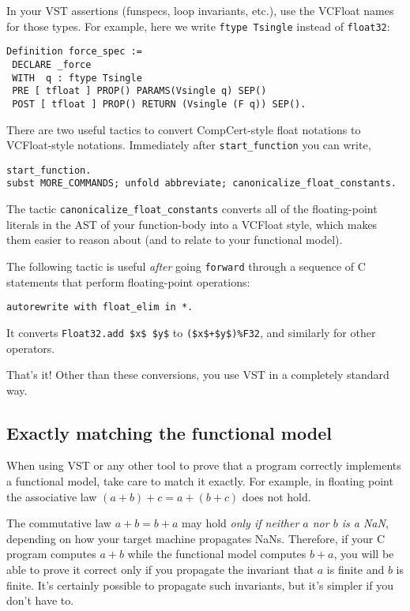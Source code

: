 \documentclass[article]{memoir}
\begin{document}
In your VST assertions (funspecs, loop invariants,
etc.), use the VCFloat names for those types.
For example, here we write \lstinline{ftype Tsingle} instead of
\lstinline{float32}:

\begin{lstlisting}
Definition force_spec :=
 DECLARE _force
 WITH  q : ftype Tsingle
 PRE [ tfloat ] PROP() PARAMS(Vsingle q) SEP()
 POST [ tfloat ] PROP() RETURN (Vsingle (F q)) SEP().
\end{lstlisting}

There are two useful tactics to convert CompCert-style float notations to VCFloat-style notations.  Immediately after \lstinline{start_function} you
can write,

\begin{lstlisting}
start_function.
subst MORE_COMMANDS; unfold abbreviate; canonicalize_float_constants.
\end{lstlisting}

The tactic \lstinline{canonicalize_float_constants} converts
all of the floating-point literals in the AST of your function-body
into a VCFloat style, which makes them easier to reason about
(and to relate to your functional model).

The following tactic is useful \emph{after} going \lstinline{forward}
through a sequence of C statements that perform floating-point
operations:
\begin{lstlisting}
autorewrite with float_elim in *.
\end{lstlisting}
It converts \lstinline{Float32.add $x$ $y$} to \lstinline{($x$+$y$)%F32},
  and similarly for other operators.

That's it!  Other than these conversions, you use VST in
a completely standard way.  

\subsection*{Exactly matching the functional model}

When using VST or any other tool to prove that a program correctly
implements a functional model, take care to
match it exactly.  For example, in floating point the
associative law $(a+b)+c=a+(b+c)$ does not hold.

The commutative law $a+b=b+a$ may hold \emph{only if
neither $a$ nor $b$ is a NaN}, depending on how your target
machine propagates NaNs.  Therefore, if your C program
computes $a+b$ while the functional model computes $b+a$,
you will be able to prove it correct only if you propagate
the invariant that $a$ is finite and $b$ is finite.
It's certainly possible to propagate such invariants, but
it's simpler if you don't have to.
\end{document}
